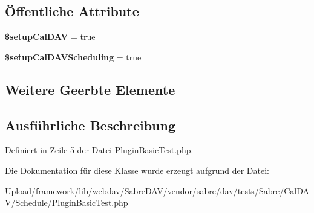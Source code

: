 \subsection*{Öffentliche Attribute}
\begin{DoxyCompactItemize}
\item 
\mbox{\label{class_sabre_1_1_cal_d_a_v_1_1_schedule_1_1_plugin_basic_test_ab51764f74f79fe57d139ee27d4c1d9a8}} 
{\bfseries \$setup\+Cal\+D\+AV} = true
\item 
\mbox{\label{class_sabre_1_1_cal_d_a_v_1_1_schedule_1_1_plugin_basic_test_ae13d1acee778d0b33971f354776454c9}} 
{\bfseries \$setup\+Cal\+D\+A\+V\+Scheduling} = true
\end{DoxyCompactItemize}
\subsection*{Weitere Geerbte Elemente}


\subsection{Ausführliche Beschreibung}


Definiert in Zeile 5 der Datei Plugin\+Basic\+Test.\+php.



Die Dokumentation für diese Klasse wurde erzeugt aufgrund der Datei\+:\begin{DoxyCompactItemize}
\item 
Upload/framework/lib/webdav/\+Sabre\+D\+A\+V/vendor/sabre/dav/tests/\+Sabre/\+Cal\+D\+A\+V/\+Schedule/Plugin\+Basic\+Test.\+php\end{DoxyCompactItemize}
